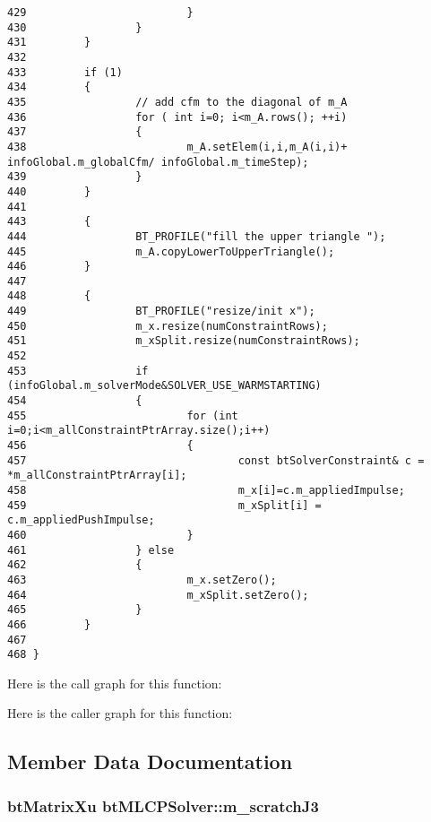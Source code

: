 \begin{Code}
\begin{verbatim}
429                         }
430                 }
431         }
432 
433         if (1)
434         {
435                 // add cfm to the diagonal of m_A
436                 for ( int i=0; i<m_A.rows(); ++i) 
437                 {
438                         m_A.setElem(i,i,m_A(i,i)+ infoGlobal.m_globalCfm/ infoGlobal.m_timeStep);
439                 }
440         }
441                                    
443         {
444                 BT_PROFILE("fill the upper triangle ");
445                 m_A.copyLowerToUpperTriangle();
446         }
447 
448         {
449                 BT_PROFILE("resize/init x");
450                 m_x.resize(numConstraintRows);
451                 m_xSplit.resize(numConstraintRows);
452 
453                 if (infoGlobal.m_solverMode&SOLVER_USE_WARMSTARTING)
454                 {
455                         for (int i=0;i<m_allConstraintPtrArray.size();i++)
456                         {
457                                 const btSolverConstraint& c = *m_allConstraintPtrArray[i];
458                                 m_x[i]=c.m_appliedImpulse;
459                                 m_xSplit[i] = c.m_appliedPushImpulse;
460                         }
461                 } else
462                 {
463                         m_x.setZero();
464                         m_xSplit.setZero();
465                 }
466         }
467 
468 }
\end{verbatim}
\end{Code}




Here is the call graph for this function:

Here is the caller graph for this function:

\subsection{Member Data Documentation}
\hypertarget{classbt_m_l_c_p_solver_8430698267e9572498e04e8dba3cda3b}{
\subsubsection[m\_\-scratchJ3]{\setlength{\rightskip}{0pt plus 5cm}btMatrixXu {\bf btMLCPSolver::m\_\-scratchJ3}}}
\label{classbt_m_l_c_p_solver_8430698267e9572498e04e8dba3cda3b}


